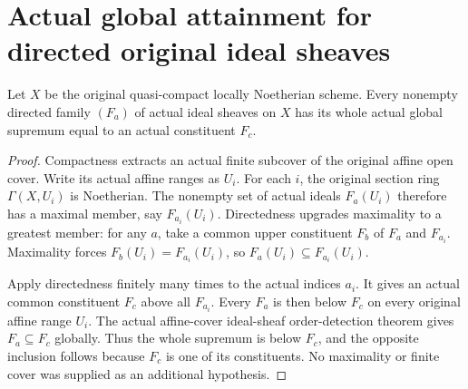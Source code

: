 \section{Actual global attainment for directed original ideal sheaves}

\begin{theorem}\label{thm:sc0-directed-original-ideal-sheaf-attainment}
\leanok
Let $X$ be the original quasi-compact locally Noetherian scheme.
Every nonempty directed family $(F_a)$ of actual ideal sheaves on
$X$ has its whole actual global supremum equal to an actual
constituent $F_c$.
\end{theorem}
\begin{proof}
Compactness extracts an actual finite subcover of the original
affine open cover. Write its actual affine ranges as $U_i$.
For each $i$, the original section ring $\Gamma(X,U_i)$ is
Noetherian. The nonempty set of actual ideals $F_a(U_i)$ therefore
has a maximal member, say $F_{a_i}(U_i)$. Directedness upgrades
maximality to a greatest member: for any $a$, take a common
upper constituent $F_b$ of $F_a$ and $F_{a_i}$. Maximality forces
$F_b(U_i)=F_{a_i}(U_i)$, so $F_a(U_i)\subseteq F_{a_i}(U_i)$.

Apply directedness finitely many times to the actual indices $a_i$.
It gives an actual common constituent $F_c$ above all $F_{a_i}$.
Every $F_a$ is then below $F_c$ on every original affine range
$U_i$. The actual affine-cover ideal-sheaf order-detection theorem
gives $F_a\subseteq F_c$ globally. Thus the whole supremum is
below $F_c$, and the opposite inclusion follows because $F_c$
is one of its constituents. No maximality or finite cover was
supplied as an additional hypothesis.
\end{proof}
